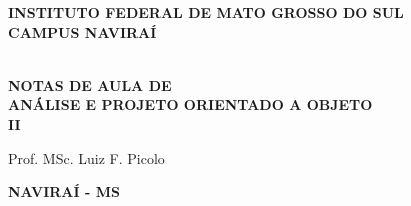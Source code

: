 \thispagestyle{empty}

\vfill
 \begin{center}
    
    {\large\bfseries INSTITUTO FEDERAL DE MATO GROSSO DO SUL} \\
    
    {\large\bfseries CAMPUS NAVIRAÍ}  \\ 

    \vspace*{1in}

    \vspace*{4cm}
    \noindent \\
    
    \large\bfseries{NOTAS DE AULA DE} \\
    \huge\bfseries{ANÁLISE E PROJETO ORIENTADO A OBJETO} \\ II
    
    \vspace*{4cm}
    
    \large{Prof. MSc. Luiz F. Picolo}
    
    \vfill
    \large\bfseries{NAVIRAÍ - MS}
\end{center}

\normalsize


